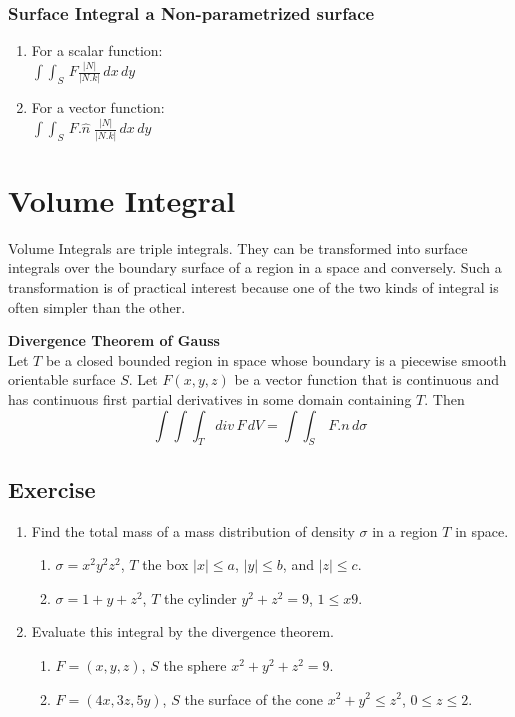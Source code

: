 \documentclass[aima331_lecturenotes_ku.tex]{subfiles}
\begin{document}
  \subsubsection{Surface Integral a Non-parametrized surface}
  \begin{enumerate}
  \item For a scalar function: \\[1mm]
    $\displaystyle \int\int_S\, F\frac{|N|}{|N.k|}\,dx\,dy$
\vspace{1cm}
      \item For a vector function: \\[1mm]
    $\displaystyle \int\int_S\, F.\hat{n}\;\frac{|N|}{|N.k|}\,dx\,dy$
  \end{enumerate}

  \section{Volume Integral}
  Volume Integrals are triple integrals. They can be transformed into surface integrals over the boundary surface of a region in a space and conversely. Such a transformation is of practical interest because one of the two kinds of integral is often simpler than the other.
  \begin{mdframed}
    \textbf{Divergence Theorem of Gauss} \\[1mm]
    Let $T$ be a closed bounded region in space whose boundary is a piecewise smooth orientable surface $S$. Let $F(x,y,z)$ be a vector function that is continuous and has continuous first partial derivatives in some domain containing $T$. Then
    \begin{equation}
      \label{divergence}
      \int \int \int _T div \, F \, dV= \int \int _S\, F.n\,d\sigma
    \end{equation}
  \end{mdframed}

  \subsection{Exercise}
  \begin{enumerate}
  \item Find the total mass of a mass distribution of density $\sigma$ in a region $T$ in space.
    \begin{enumerate}
    \item $\sigma = x^2y^2z^2$, $T$ the box $|x| \leq a$, $|y| \leq b$, and $|z| \leq c$.
     \item $\sigma = 1 + y+z^2$, $T$ the cylinder $y^2+z^2=9$, $1 \leq x 9$.
     \end{enumerate}

   \item Evaluate this integral by the divergence theorem.
     \begin{enumerate}
     \item $F=(x,y,z)$, $S$ the sphere $x^2+y^2+z^2 =9$.

     \item $F=(4x, 3z, 5y)$, $S$ the surface of the cone $x^2+y^2 \leq z^2$, $0\leq z\leq 2$.
     \end{enumerate}
  \end{enumerate}
\end{document}
